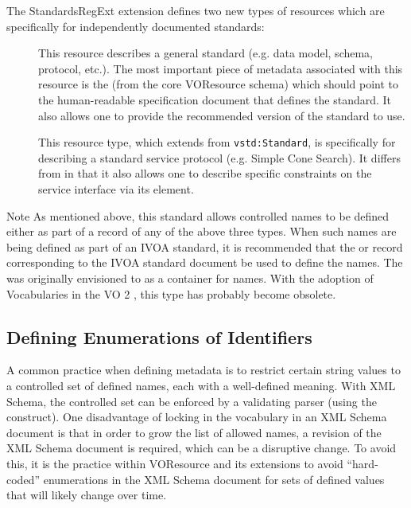 \documentclass[11pt,a4paper]{ivoa}
\begin{document}
The StandardsRegExt extension defines two new types of resources which
are specifically for independently documented standards:

\begin{description}
\item[] This resource describes a general standard (e.g. data model,
       schema, protocol, etc.).  The most important piece of metadata
       associated with this resource is the
       (from the core VOResource schema)
       which should point to the human-readable specification document
       that defines the standard.  It also allows one to provide the
       recommended version of the standard to use.
\item[] This resource type, which extends from
       \texttt{vstd:Standard}, is specifically for describing a
       standard service protocol (e.g. Simple Cone Search).  It
       differs from  in that it also allows
       one to describe specific constraints on the service interface
       via its
       element.


\end{description}

\begin{admonition}{Note}
       As mentioned above, this standard allows controlled names to be
       defined either as part of a record of any of the above three
       types.  When such names are being defined as part of an IVOA
       standard, it is recommended that the  or
        record corresponding to the
       IVOA standard document be used to define the names.  The
        was originally envisioned to
       as a container for names.  With the adoption of Vocabularies in
       the VO 2 \citep{2021ivoa.spec.0525D}, this type has probably
       become obsolete.
\end{admonition}


\subsection{Defining Enumerations of Identifiers }
\label{sect:keys}

A common practice when defining metadata is to restrict
certain string values to a controlled set of defined names, each with
a well-defined meaning.  With XML
Schema, the controlled set can be enforced by a validating parser
(using the  construct).
One disadvantage of locking in the
vocabulary in an XML Schema document is that in order to grow the list
of allowed names, a revision of the XML Schema document is required,
which can be a disruptive change.  To avoid this, it is the practice
within VOResource and its extensions to avoid ``hard-coded''
enumerations in the XML Schema document for sets of defined values
that will likely change over time.
\end{document}
